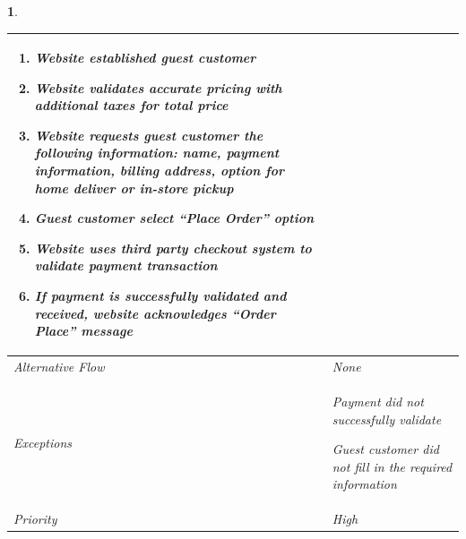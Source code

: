 \documentclass{scrreprt}
\theoremstyle{funreq}
\newtheorem{funreq}{}
\begin{document}
\begin{funreq}
\begin{table}[H]
{\begin{tabularx}{\columnwidth}{|l|X|}
\begin{enumerate}
					\item Website established guest customer
					
					\item Website validates accurate pricing with additional taxes for total price
					
					\item Website requests guest customer the following information: name, payment information, billing address, option for home deliver or in-store pickup
					
					\item Guest customer select “Place Order” option
					
					\item Website uses third party checkout system to validate payment transaction
					
					\item If payment is successfully validated and received, website acknowledges “Order Place” message
				\end{enumerate}
					\\ \hline
					
					Alternative Flow & None                                       \\ \hline
					Exceptions       & Payment did not successfully validate
					
					Guest customer did not fill in the required information
					\\ \hline
					Priority & High                                       \\ \hline
				\end{tabularx}%
			}
		\end{table}
	\end{funreq}

\end{document}
